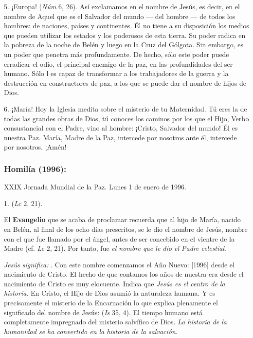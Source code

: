 \begin{body}
	5. ¡Europa!  (\emph{Núm} 6, 26). Así exclamamos en el nombre de Jesús, es decir, en el nombre de Aquel que es el Salvador del mundo --- del hombre --- de todos los hombres: de naciones, países y continentes. Él no tiene a su disposición los medios que pueden utilizar los estados y los poderosos de esta tierra. Su poder radica en la pobreza de la noche de Belén y luego en la Cruz del Gólgota. Sin embargo, es un poder que penetra más profundamente. De hecho, sólo este poder puede erradicar el odio, el principal enemigo de la paz, en las profundidades del ser humano. Sólo l es capaz de transformar a los trabajadores de la guerra y la destrucción en constructores de paz, a los que se puede dar el nombre de hijos de Dios.

	6. ¡María! Hoy la Iglesia medita sobre el misterio de tu Maternidad. Tú eres la  de todas las grandes obras de Dios, tú conoces los caminos por los que el Hijo, Verbo consustancial con el Padre, vino al hombre: ¡Cristo, Salvador del mundo! Él es nuestra Paz. María, Madre de la Paz, intercede por nosotros ante él, intercede por nosotros. ¡Amén!

	\subsubsection{Homilía (1996):}

	XXIX Jornada Mundial de la Paz. Lunes 1 de enero de 1996.

	1.  (\emph{Lc} 2, 21).

	El \textbf{Evangelio} que se acaba de proclamar recuerda que al hijo de María, nacido en Belén, al final de los ocho días prescritos, se le dio el nombre de Jesús, nombre con el que fue llamado por el ángel, antes de ser concebido en el vientre de la Madre (cf. \emph{Lc} 2, 21). Por tanto, fue \emph{el nombre que le dio el Padre celestial}.

	\emph{Jesús significa: }. Con este nombre comenzamos el Año Nuevo: {[}1996{]} desde el nacimiento de Cristo. El hecho de que contamos los años de nuestra era desde el nacimiento de Cristo es muy elocuente. Indica que \emph{Jesús es el centro de la historia}. En Cristo, el Hijo de Dios asumió la naturaleza humana. Y es precisamente el misterio de la Encarnación lo que explica plenamente el significado del nombre de Jesús:  (\emph{Is} 35, 4). El tiempo humano está completamente impregnado del misterio salvífico de Dios. \emph{La historia de la humanidad se ha convertido en la historia de la salvación}.


\end{body}
